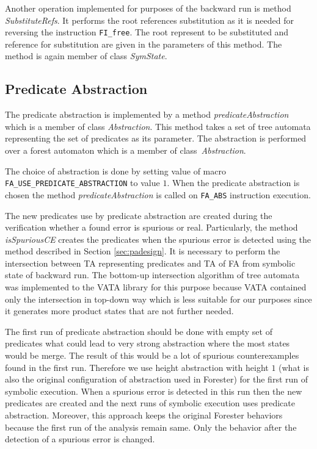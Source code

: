 Another operation implemented for purposes of the backward run is
method \emph{SubstituteRefs}.
It performs the root references substitution as it is needed
for reversing the instruction {\tt FI\_free}.
The root represent to be substituted and reference for substitution are
given in the parameters of this method.
The method is again member of class \emph{SymState}.

\subsection{Predicate Abstraction}
\label{subsec:paimpl}

The predicate abstraction is implemented by a method \emph{predicateAbstraction}
which is a member of class \emph{Abstraction}.
This method takes a set of tree automata representing the set of predicates
as its parameter.
The abstraction is performed over a forest automaton which is a member of
class~\emph{Abstraction}.

The choice of abstraction is done by setting value of macro
{\tt FA\_USE\_PREDICATE\_ABSTRACTION} to value $1$.
When the predicate abstraction is chosen the method \emph{predicateAbstraction}
is called on {\tt FA\_ABS} instruction execution.

The new predicates use by predicate abstraction are created during
the verification whether a found error is spurious or real.
Particularly, the method \emph{isSpuriousCE} creates the predicates
when the spurious error is detected using the method described
in Section \ref{sec:padesign}.
It is necessary to perform the intersection between TA representing
predicates and TA of FA from symbolic state of backward run.
The bottom-up intersection algorithm of tree automata was implemented
to the VATA library for this purpose because VATA contained only the
intersection in top-down way which is less suitable for our purposes since
it generates more product states that are not further needed.

The first run of predicate abstraction should be done
with empty set of predicates what could lead to very
strong abstraction where the most states would be merge.
The result of this would be a lot of spurious counterexamples found
in the first run.
Therefore we use height abstraction with height $1$ (what is
also the original configuration of abstraction used in Forester)
for the first run of symbolic execution.
When a spurious error is detected in this run then the new
predicates are created and the next runs of symbolic execution uses predicate abstraction.
Moreover, this approach keeps the original Forester behaviors
because the first run of the analysis remain same.
Only the behavior after the detection of a spurious error is changed.


